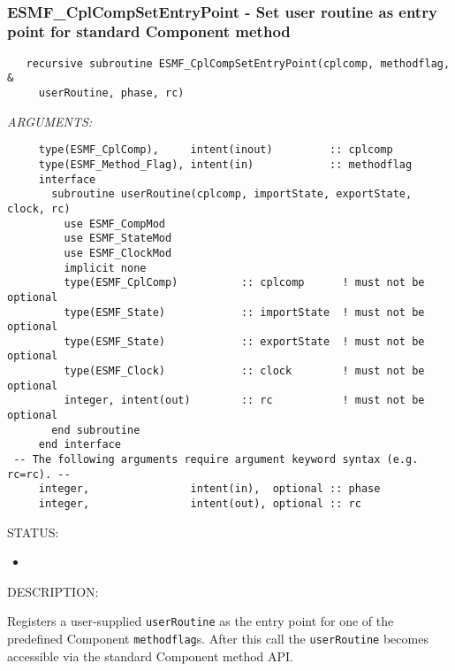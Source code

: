  
\mbox{}\hrulefill\ 
 
\subsubsection [ESMF\_CplCompSetEntryPoint] {ESMF\_CplCompSetEntryPoint - Set user routine as entry point for standard Component method}


  
\begin{verbatim}   recursive subroutine ESMF_CplCompSetEntryPoint(cplcomp, methodflag, &
     userRoutine, phase, rc)
 \end{verbatim}{\em ARGUMENTS:}
\begin{verbatim}     type(ESMF_CplComp),     intent(inout)         :: cplcomp
     type(ESMF_Method_Flag), intent(in)            :: methodflag
     interface
       subroutine userRoutine(cplcomp, importState, exportState, clock, rc)
         use ESMF_CompMod
         use ESMF_StateMod
         use ESMF_ClockMod
         implicit none
         type(ESMF_CplComp)          :: cplcomp      ! must not be optional
         type(ESMF_State)            :: importState  ! must not be optional
         type(ESMF_State)            :: exportState  ! must not be optional
         type(ESMF_Clock)            :: clock        ! must not be optional
         integer, intent(out)        :: rc           ! must not be optional
       end subroutine
     end interface
 -- The following arguments require argument keyword syntax (e.g. rc=rc). --
     integer,                intent(in),  optional :: phase
     integer,                intent(out), optional :: rc\end{verbatim}
{\sf STATUS:}
   \begin{itemize}
   \item{}
   \end{itemize}
  
{\sf DESCRIPTION:\\ }


   Registers a user-supplied {\tt userRoutine} as the entry point for one of the
   predefined Component {\tt methodflag}s. After this call the {\tt userRoutine}
   becomes accessible via the standard Component method API.
  
